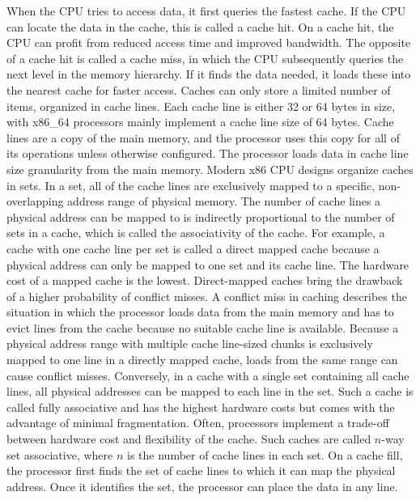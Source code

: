 When the CPU tries to access data, it first queries the fastest cache. If the
CPU can locate the data in the cache, this is called a cache hit. On a cache
hit, the CPU can profit from reduced access time and improved bandwidth. The
opposite of a cache hit is called a cache miss, in which the CPU subsequently
queries the next level in the memory hierarchy. If it finds the data needed, it
loads these into the nearest cache for faster access. Caches can only store a
limited number of items, organized in cache lines. Each cache line is either 32
or 64 bytes in size, with x86\_64 processors mainly implement a cache line size
of 64 bytes. Cache lines are a copy of the main memory, and the processor uses
this copy for all of its operations unless otherwise configured. The processor
loads data in cache line size granularity from the main memory. Modern x86 CPU
designs organize caches in sets. In a set, all of the cache lines are
exclusively mapped to a specific, non-overlapping address range of physical
memory. The number of cache lines a physical address can be mapped to is
indirectly proportional to the number of sets in a cache, which is called the
associativity of the cache. For example, a cache with one cache line per set is
called a direct mapped cache because a physical address can only be mapped to
one set and its cache line. The hardware cost of a mapped cache is the lowest.
Direct-mapped caches bring the drawback of a higher probability of conflict
misses. A conflict miss in caching describes the situation in which the
processor loads data from the main memory and has to evict lines from the cache
because no suitable cache line is available. Because a physical address range
with multiple cache line-sized chunks is exclusively mapped to one line in a
directly mapped cache, loads from the same range can cause conflict misses.
Conversely, in a cache with a single set containing all cache lines, all
physical addresses can be mapped to each line in the set. Such a cache is called
fully associative and has the highest hardware costs but comes with the
advantage of minimal fragmentation. Often, processors implement a trade-off
between hardware cost and flexibility of the cache. Such caches are called
$n$-way set associative, where $n$ is the number of cache lines in each set. On
a cache fill, the processor first finds the set of cache lines to which it can
map the physical address. Once it identifies the set, the processor can place
the data in any line. \\

